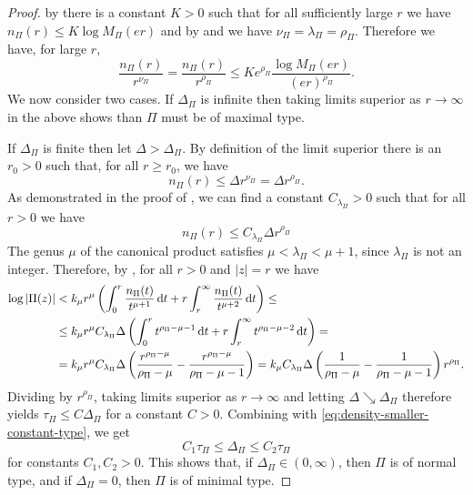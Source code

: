\begin{proof}
    by  there is a constant $K > 0$ such that for all sufficiently large $r$ we have $n_\Pi(r) \leq K \log M_\Pi(er)$ and by  and  we have $\nu_\Pi = \lambda_\Pi = \rho_\Pi$. Therefore we have, for large $r$,
    \begin{equation} \label{eq:density-smaller-constant-type}
        \frac{n_\Pi(r)}{r^{\nu_\Pi}} = \frac{n_\Pi(r)}{r^{\rho_\Pi}} \leq K e^{\rho_\Pi} \frac{\log M_\Pi(er)}{(e r)^{\rho_\Pi}}.
    \end{equation}
    We now consider two cases. If $\Delta_\Pi$ is infinite then taking limits superior as $r \to \infty$ in the above shows than $\Pi$ must be of maximal type.

    If $\Delta_\Pi$ is finite then let $\Delta > \Delta_\Pi$. By definition of the limit superior there is an $r_0 > 0$ such that, for all $r \geq r_0$, we have
    \begin{equation*}
        n_\Pi(r) \leq \Delta r^{\nu_\Pi} = \Delta r^{\rho_\Pi}. 
    \end{equation*}
    As demonstrated in the proof of , we can find a constant $C_{\lambda_\Pi} > 0$ such that for all $r > 0$ we have
    \begin{equation*}
        n_\Pi(r) \leq C_{\lambda_\Pi} \Delta r^{\rho_\Pi}
    \end{equation*}
    The genus $\mu$ of the canonical product satisfies $\mu < \lambda_\Pi < \mu + 1$, since $\lambda_\Pi$ is not an integer. Therefore, by , for all $r > 0$ and $\vert z \vert = r$ we have
    \begin{align*}
        \log \vert \Pi(z) \vert &< k_\mu r^\mu \left( \int_0^r \frac{n_\Pi(t)}{t^{\mu + 1}} \mathop{}\!\mathrm{d} t + r \int_r^\infty \frac{n_\Pi(t)}{t^{\mu + 2}} \mathop{}\!\mathrm{d} t \right) \leq \\
        &\leq k_\mu r^\mu C_{\lambda_\Pi} \Delta \left( \int_0^r t^{\rho_\Pi - \mu - 1} \mathop{}\!\mathrm{d} t + r \int_r^\infty t^{\rho_\Pi - \mu - 2} \mathop{}\!\mathrm{d} t \right) = \\
        &= k_\mu r^\mu C_{\lambda_\Pi} \Delta \left( \frac{r^{\rho_\Pi - \mu}}{\rho_\Pi - \mu} - \frac{r^{\rho_\Pi - \mu}}{\rho_\Pi - \mu - 1} \right) = k_\mu C_{\lambda_\Pi} \Delta \left( \frac{1}{\rho_\Pi - \mu} - \frac{1}{\rho_\Pi - \mu - 1} \right) r^{\rho_\Pi}.
    \end{align*}
    Dividing by $r^{\rho_\Pi}$, taking limits superior as $r \to \infty$ and letting $\Delta \searrow \Delta_\Pi$ therefore yields $\tau_\Pi \leq C \Delta_\Pi$ for a constant $C > 0$. Combining with \eqref{eq:density-smaller-constant-type}, we get
    \begin{equation*}
        C_1 \tau_\Pi \leq \Delta_\Pi \leq C_2 \tau_\Pi
    \end{equation*}
    for constants $C_1, C_2 > 0$. This shows that, if $\Delta_\Pi \in (0, \infty)$, then $\Pi$ is of normal type, and if $\Delta_\Pi = 0$, then $\Pi$ is of minimal type.
\end{proof}